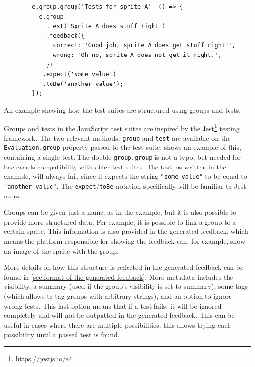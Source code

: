 \documentclass[../main]{subfiles}
\begin{document}
\begin{listing}
    \centering
    \begin{verbatim}
        e.group.group('Tests for sprite A', () => {
          e.group
            .test('Sprite A does stuff right')
            .feedback({
              correct: 'Good job, sprite A does get stuff right!',
              wrong: 'Oh no, sprite A does not get it right.',
            })
           .expect('some value')
           .toBe('another value');
        });
    \end{verbatim}
    \caption{An example showing how the test suites are structured using groups and tests.}\label{lst:itch-test-suite-structure}
\end{listing}

Groups and tests in the JavaScript test suites are inspired by the Jest\footnote{\url{https://jestjs.io/}} testing framework.
The two relevant methods, \texttt{group} and \texttt{test} are available on the \texttt{Evaluation.group} property passed to the test suite.
 shows an example of this, containing a single test.
The double \texttt{group.group} is not a typo, but needed for backwards compatibility with older test suites.
The test, as written in the example, will always fail, since it expects the string \texttt{"some value"} to be equal to \texttt{"another value"}.
The \texttt{expect}/\texttt{toBe} notation specifically will be familiar to Jest users.

Groups can be given just a name, as in the example, but it is also possible to provide more structured data.
For example, it is possible to link a group to a certain sprite.
This information is also provided in the generated feedback, which means the platform responsible for showing the feedback can, for example, show an image of the sprite with the group.

More details on how this structure is reflected in the generated feedback can be found in \cref{sec:format-of-the-generated-feedback}.
More metadata includes the visibility, a summary (used if the group's visibility is set to summary), some tags (which allows to tag groups with arbitrary strings), and an option to ignore wrong tests.
This last option means that if a test fails, it will be ignored completely and will not be outputted in the generated feedback.
This can be useful in cases where there are multiple possibilities: this allows trying each possibility until a passed test is found.
\end{document}
